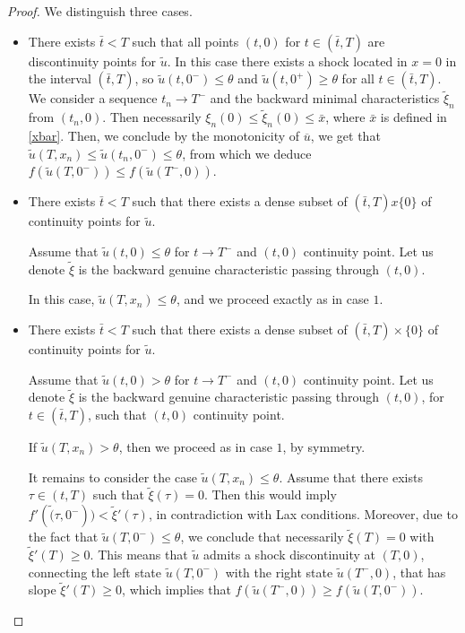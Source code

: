 \documentclass[10pt,a4paper]{amsart}
\begin{document}
\begin{proof}
 
We distinguish three cases.
\begin{itemize}
\item[(i)] There exists $\bar t<T$ such that all points $(t,0)$ for $t\in (\bar t, T)$ 
are discontinuity points for $\widetilde u$. In this case there exists a shock located in $x=0$ in the interval 
$(\bar t, T)$, so $\widetilde u(t, 0^-)\leq \theta$ and $\widetilde u(t, 0^+)\geq \theta$ for all $t\in  (\bar t, T)$. 
We consider a sequence $t_n\to T^-$ and the backward minimal characteristics $\widetilde \xi_n$ from $(t_n, 0)$.  
Then necessarily $\xi_n(0)\leq \widetilde \xi_n(0)\leq \bar x$, where $\bar x$ is defined in \eqref{xbar}. 
Then, we conclude by the monotonicity of $\overline u$, we get that 
$\widetilde u(T,x_n)\leq \widetilde u(t_n, 0^-)\leq \theta$, from which we deduce 
 $ f(\widetilde{u}(T, 0^-))\leq f(\widetilde{u}(T^-, 0))$.
\item[(ii)] There exists $\bar t<T$ such that  there exists a dense subset  of $ (\bar t, T)x\{0\}$ 
of continuity points for $\widetilde u$. 

Assume that  
$\widetilde u(t, 0)\leq \theta$ for $t\to T^-$ and $(t,0) $ continuity point. Let us denote $\widetilde\xi$ is the backward 
genuine characteristic passing through $(t,0)$.

In this case, $\widetilde u(T, x_n)\leq \theta$, and we proceed exactly as in case $1$. 
\item[(iii)] There exists $\bar t<T$ such that  there exists a dense subset  of $ (\bar t, T)\times\{0\}$ 
of continuity points for $\widetilde u$. 

Assume that  
$\widetilde u(t, 0)> \theta$ for $t\to T^-$ and $(t,0) $  continuity point. Let us denote $\widetilde\xi$ 
is the backward genuine characteristic passing through $(t,0)$, for $t\in (\bar t, T)$, such that $(t,0)$ continuity point.

If $\widetilde u(T, x_n)>  \theta$, then we proceed as in case $1$, by symmetry.

It remains to consider the case $\widetilde u(T, x_n)\leq \theta$. Assume that there exists $\tau\in (t, T)$ 
such that $\widetilde \xi(\tau)=0$. Then this would imply $f'(\widetilde(\tau, 0^-))<\widetilde\xi'(\tau)$, 
in contradiction with Lax conditions. Moreover, due to the fact that $\widetilde u(T, 0^-)\leq \theta$, 
we conclude that necessarily $\widetilde \xi(T)=0$ with $\widetilde \xi'(T)\geq 0$. This means that $\widetilde{u}$ 
admits a shock discontinuity
at $(T,0)$, connecting the left state $\widetilde{u}(T, 0^-)$ with the right state $\widetilde{u}(T^-, 0)$,
that has slope $\widetilde \xi'(T)\geq 0$,
which implies that $f(\widetilde{u}(T^-, 0))\geq  f(\widetilde{u}(T, 0^-))$.
\end{itemize}
 

\end{proof}
\end{document}
